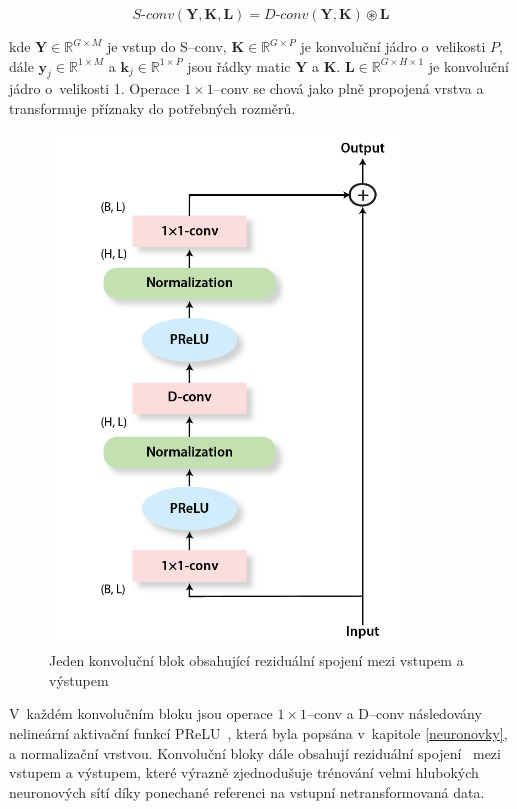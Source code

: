 \begin{equation}
	S\texttt{-}conv(\boldsymbol{Y}, \boldsymbol{K}, \boldsymbol{L}) = D\texttt{-}conv(\boldsymbol{Y}, \boldsymbol{K}) \circledast \boldsymbol{L}
\end{equation}

kde $\boldsymbol{Y} \in \mathbb{R}^{G \times M}$ je vstup do S--conv, $\boldsymbol{K} \in \mathbb{R}^{G \times P}$ je konvoluční jádro o~velikosti $P$, dále $\boldsymbol{y}_j \in \mathbb{R}^{1 \times M}$ a $\boldsymbol{k}_j \in \mathbb{R}^{1 \times P}$ jsou řádky matic $\boldsymbol{Y}$ a $\boldsymbol{K}$. $\boldsymbol{L} \in \mathbb{R}^{G \times H \times 1}$ je konvoluční jádro o~velikosti 1. Operace $1 \times 1$--conv se chová jako plně propojená vrstva a transformuje příznaky do potřebných rozměrů.

\begin{figure}[H]
    \centering
    \includegraphics[scale=0.5]{obrazky-figures/conv-res-block.png}
    \caption{\label{fig:tasnet-convblock}Jeden konvoluční blok obsahující reziduální spojení mezi vstupem a výstupem}
\end{figure}

V~každém konvolučním bloku jsou operace $1 \times 1$--conv a D--conv následovány nelineární aktivační funkcí PReLU~\cite{he2015delving}, která byla popsána v~kapitole \ref{neuronovky}, a normalizační vrstvou. Konvoluční bloky dále obsahují reziduální spojení~\cite{he2015deep} mezi vstupem a výstupem, které výrazně zjednodušuje trénování velmi hlubokých neuronových sítí díky ponechané referenci na vstupní netransformovaná data.

